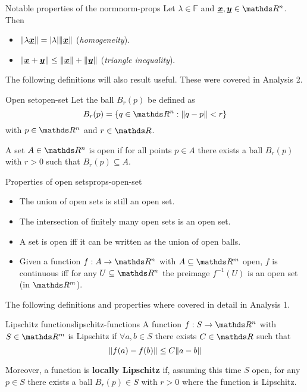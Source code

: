 \documentclass[12pt]{extarticle}
\renewcommand{\vec}[1]{\uvec{#1}}
\begin{document}
\begin{proposition}{Notable properties of the norm}{norm-props}
	Let $\lambda \in \mathbb F$ and $\vec x, \vec y \in \R^n$. Then
	\begin{itemize}
		\item $\norm{\lambda \vec x} = \abs{\lambda}\norm{\vec x}$ (\textit{homogeneity}).
		\item $\norm{\vec x + \vec y} \leq \norm{\vec x} + \norm{\vec y}$ (\textit{triangle inequality}).
	\end{itemize}
\end{proposition}

The following definitions will also result useful. These were covered in Analysis 2.

\begin{definition}{Open set}{open-set}
	Let the ball $B_r(p)$ be defined as
	\begin{equation}
		B_r(p) = \{ q \in \R^n : \norm{q - p} < r \}
	\end{equation}
	with $p \in \R^n$ and $r \in \R$.

	A set $A \in \R^n$ is open if for all points $p \in A$ there exists a ball $B_r(p)$ with $r > 0$ such that $B_r(p) \subseteq A$.
\end{definition}

\begin{proposition}{Properties of open sets}{props-open-set}
	\begin{itemize}
		\item The union of open sets is still an open set.
		\item The intersection of finitely many open sets is an open set.
		\item A set is open iff it can be written as the union of open balls.
		\item Given a function $f:A \to \R^n$ with $A \subseteq \R^m$ open, $f$ is continuous iff for any $U \subseteq \R^n$ the preimage $f^{-1}(U)$ is an open set (in $\R^m$).
	\end{itemize}
\end{proposition}

The following definitions and properties where covered in detail in Analysis 1.

\begin{definition}{Lipschitz functions}{lipschitz-functions}
	A function $f: S \to \R^n$ with $S\in \R^m$ is Lipschitz if $\forall a, b \in S$ there exists $C \in \R$ such that
	\begin{equation}
		\norm{f(a) - f(b)} \leq C \norm{a - b}
	\end{equation}

	Moreover, a function is \textbf{locally Lipschitz} if, assuming this time $S$ open,
	for any $p \in S$ there exists a ball $B_r(p) \in S$ with $r > 0$ where the function is Lipschitz.
\end{definition}
\end{document}
